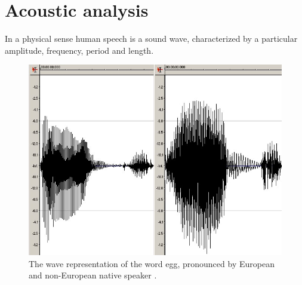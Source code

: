 \documentclass[11pt,a4paper]{report}
\begin{document}
\section {Acoustic analysis}
In a physical sense human speech is a sound wave, characterized by a
particular amplitude, frequency, period and length. 
\begin  {figure} [h]
\begin {center}
     \includegraphics[height=5.0 cm]{egg}
     \caption {The wave representation of the word egg, pronounced by European
     and non-European native speaker \citep{SpeechRecognition}.}
     \label {fig:egg}
     \end {center}
     \end {figure}
\end{document}
